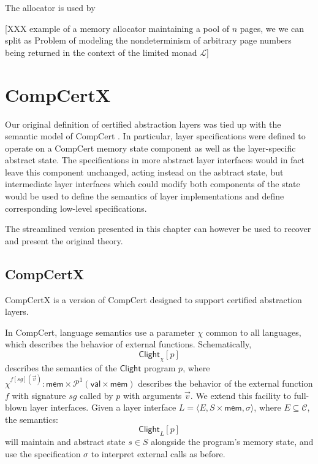 \documentclass[draft,11pt]{report}
\theoremstyle{definition}
\newcommand{\kw}[1]{\ensuremath{ \mathsf{#1} }}
\begin{document}
The allocator is used by 

[XXX example of a memory allocator maintaining a pool of $n$ pages,
we we can split as
Problem of modeling the nondeterminism of
arbitrary page numbers being returned in the context
of the limited monad $\mathcal{L}$]



\section{CompCertX} \label{sec:cal:compcertx} %

Our original definition of certified abstraction layers
was tied up with the semantic model of CompCert
\citep{popl15}.
In particular,
layer specifications were defined to operate
on a CompCert memory state component as well as
the layer-specific abstract state.
The specifications in more abstract layer interfaces 
would in fact leave this component unchanged,
acting instead on the asbtract state,
but intermediate layer interfaces which could
modify both components of the state would be used
to define the semantics of layer implementations
and define corresponding low-level specifications.

The streamlined version presented in this chapter
can however be used to recover and present the original theory.

\subsection{CompCertX}

CompCertX is a version of CompCert
designed to support certified abstraction layers.

In CompCert,
language semantics use a parameter
$\chi$
common to all languages,
which describes the behavior of external functions.
Schematically,
\[
  \kw{Clight}_\chi[p]
\]
describes the semantics of the \kw{Clight} program $p$,
where
$\chi^{f[\mathit{sg}](\vec{v})} :
 \kw{mem} \times \mathcal{P}^1(\kw{val} \times \kw{mem})$
describes the behavior of
the external function $f$ with signature $\mathit{sg}$
called by $p$ with arguments $\vec{v}$.
We extend this facility to full-blown layer interfaces.
Given a layer interface
$L = \langle E, S \times \kw{mem}, \sigma \rangle$,
where
$E \subseteq \mathcal{C}$,
the semantics:
\[
  \kw{Clight}_L[p]
\]
will maintain and abstract state $s \in S$
alongside the program's memory state,
and use the specification $\sigma$
to interpret external calls as before.
\end{document}

